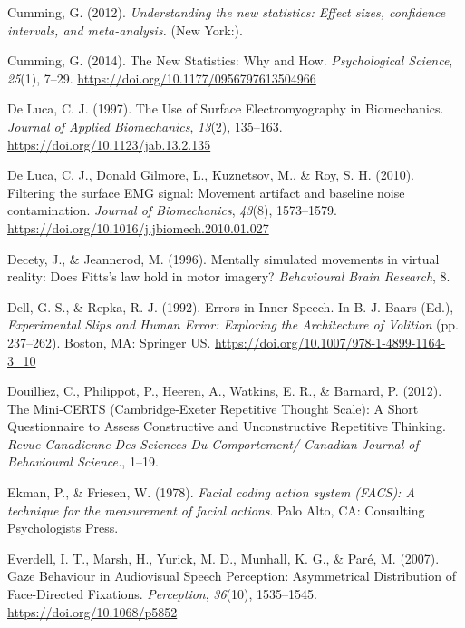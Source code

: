 \documentclass[a4paper,12pt,twoside,openright,oldfontcommands]{memoir}
\begin{document}
\hypertarget{ref-Cumming2012}{}
Cumming, G. (2012). \emph{Understanding the new statistics: Effect
sizes, confidence intervals, and meta-analysis.} (New York:).

\hypertarget{ref-cumming_new_2014}{}
Cumming, G. (2014). The New Statistics: Why and How. \emph{Psychological
Science}, \emph{25}(1), 7--29.
\url{https://doi.org/10.1177/0956797613504966}

\hypertarget{ref-de_luca_use_1997}{}
De Luca, C. J. (1997). The Use of Surface Electromyography in
Biomechanics. \emph{Journal of Applied Biomechanics}, \emph{13}(2),
135--163. \url{https://doi.org/10.1123/jab.13.2.135}

\hypertarget{ref-de_luca_filtering_2010}{}
De Luca, C. J., Donald Gilmore, L., Kuznetsov, M., \& Roy, S. H. (2010).
Filtering the surface EMG signal: Movement artifact and baseline noise
contamination. \emph{Journal of Biomechanics}, \emph{43}(8), 1573--1579.
\url{https://doi.org/10.1016/j.jbiomech.2010.01.027}

\hypertarget{ref-decety_mentally_1996}{}
Decety, J., \& Jeannerod, M. (1996). Mentally simulated movements in
virtual reality: Does Fitts's law hold in motor imagery?
\emph{Behavioural Brain Research}, 8.

\hypertarget{ref-dell_errors_1992}{}
Dell, G. S., \& Repka, R. J. (1992). Errors in Inner Speech. In B. J.
Baars (Ed.), \emph{Experimental Slips and Human Error: Exploring the
Architecture of Volition} (pp. 237--262). Boston, MA: Springer US.
\url{https://doi.org/10.1007/978-1-4899-1164-3_10}

\hypertarget{ref-Douilliez2012}{}
Douilliez, C., Philippot, P., Heeren, A., Watkins, E. R., \& Barnard, P.
(2012). The Mini-CERTS (Cambridge-Exeter Repetitive Thought Scale): A
Short Questionnaire to Assess Constructive and Unconstructive Repetitive
Thinking. \emph{Revue Canadienne Des Sciences Du Comportement/ Canadian
Journal of Behavioural Science.}, 1--19.

\hypertarget{ref-ekman_facial_1978}{}
Ekman, P., \& Friesen, W. (1978). \emph{Facial coding action system
(FACS): A technique for the measurement of facial actions}. Palo Alto,
CA: Consulting Psychologists Press.

\hypertarget{ref-everdell_gaze_2007}{}
Everdell, I. T., Marsh, H., Yurick, M. D., Munhall, K. G., \& Paré, M.
(2007). Gaze Behaviour in Audiovisual Speech Perception: Asymmetrical
Distribution of Face-Directed Fixations. \emph{Perception},
\emph{36}(10), 1535--1545. \url{https://doi.org/10.1068/p5852}
\end{document}
